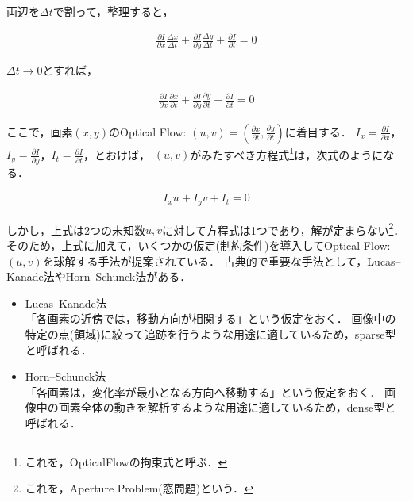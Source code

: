 \documentclass[11pt,a4j]{jarticle}
\begin{document}
      両辺を$\Delta t$で割って，整理すると，

      \begin{align}
        \frac{\partial I}{\partial x} \frac{\Delta x}{\Delta t} + \frac{\partial I}{\partial y} \frac{\Delta y}{\Delta t} + \frac{\partial I}{\partial t} = 0
      \end{align}

      $\Delta t \to 0$とすれば，

      \begin{align}
        \frac{\partial I}{\partial x} \frac{\partial x}{\partial t} + \frac{\partial I}{\partial y} \frac{\partial y}{\partial t} + \frac{\partial I}{\partial t} = 0
      \end{align}

      ここで，画素$(x,y)$のOptical Flow: $(u,v) = \left(\frac{\partial x}{\partial t}, \frac{\partial y}{\partial t} \right)$に着目する．
      $I_x = \frac{\partial I}{\partial x}$，$I_y = \frac{\partial I}{\partial y}$，$I_t = \frac{\partial I}{\partial t}$，とおけば，
      $(u,v)$がみたすべき方程式\footnote{これを，OpticalFlowの拘束式と呼ぶ．}は，次式のようになる．

      \begin{align}
        I_x u + I_y v + I_t = 0
      \end{align}

      しかし，上式は2つの未知数$u,v$に対して方程式は1つであり，解が定まらない\footnote{これを，Aperture Problem(窓問題)という．}．\cite{Szeliski:2010:CVA:1941882}
      そのため，上式に加えて，いくつかの仮定(制約条件)を導入してOptical Flow: $(u,v)$を球解する手法が提案されている．
      古典的で重要な手法として，Lucas–Kanade法やHorn–Schunck法がある．\cite{Horn:1980:DOF:888857}\cite{Lucas:1981:IIR:1623264.1623280}\cite{Harris88acombined}\cite{Tomasi91detectionand}

      \begin{itemize}
        \item Lucas–Kanade法 \\
          「各画素の近傍では，移動方向が相関する」という仮定をおく．
          画像中の特定の点(領域)に絞って追跡を行うような用途に適しているため，sparse型と呼ばれる．
        \item Horn–Schunck法 \\
          「各画素は，変化率が最小となる方向へ移動する」という仮定をおく．
          画像中の画素全体の動きを解析するような用途に適しているため，dense型と呼ばれる．
      \end{itemize}      
\end{document}
